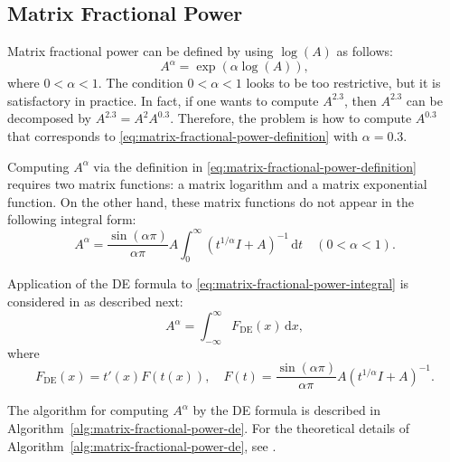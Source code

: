 \subsection{{Matrix Fractional Power}}\label{sec:matrix-fractional-power}

{Matrix fractional power can be defined by using $\log(A)$ as follows:}
\begin{equation}\label{eq:matrix-fractional-power-definition}A^\alpha=\exp(\alpha\log(A)),\end{equation}
{where $0<\alpha<1$. The condition $0<\alpha<1$ looks to be too restrictive, but it is satisfactory in practice. In fact, if one wants to compute $A^{2.3}$, then $A^{2.3}$ can be decomposed by $A^{2.3}=A^2A^{0.3}$. Therefore, the problem is how to compute $A^{0.3}$ that corresponds to \eqref{eq:matrix-fractional-power-definition} with $\alpha=0.3$.}

{Computing $A^\alpha$ via the definition in \eqref{eq:matrix-fractional-power-definition} requires two matrix functions: a matrix logarithm and a matrix exponential function. On the other hand, these matrix functions do not appear in the following integral form:}
\begin{equation}\label{eq:matrix-fractional-power-integral}A^\alpha=\frac{\sin(\alpha\pi)}{\alpha\pi}A\int_0^\infty(t^{1/\alpha}I+A)^{-1}\,\mathrm{d}t\quad(0<\alpha<1).\end{equation}

{Application of the DE formula to \eqref{eq:matrix-fractional-power-integral} is considered in  as described next:}
\begin{equation}\label{eq:matrix-fractional-power-de-integral}A^\alpha=\int_{-\infty}^\infty F_{\mathrm{DE}}(x)\,\mathrm{d}x,\end{equation}
{where}
\begin{equation}\label{eq:matrix-fractional-power-de-integrand}F_{\mathrm{DE}}(x)=t'(x)F(t(x)),\quad F(t)=\frac{\sin(\alpha\pi)}{\alpha\pi}A(t^{1/\alpha}I+A)^{-1}.\end{equation}

{The algorithm for computing $A^\alpha$ by the DE formula is described in Algorithm~\ref{alg:matrix-fractional-power-de}. For the theoretical details of Algorithm~\ref{alg:matrix-fractional-power-de}, see .}

